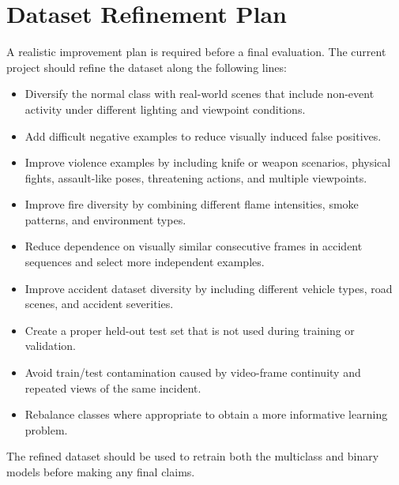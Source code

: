 \documentclass[11pt,a4paper]{article}
\begin{document}
\section{Dataset Refinement Plan}
A realistic improvement plan is required before a final evaluation. The current project should refine the dataset along the following lines:
\begin{itemize}[leftmargin=1.5em]
    \item Diversify the normal class with real-world scenes that include non-event activity under different lighting and viewpoint conditions.
    \item Add difficult negative examples to reduce visually induced false positives.
    \item Improve violence examples by including knife or weapon scenarios, physical fights, assault-like poses, threatening actions, and multiple viewpoints.
    \item Improve fire diversity by combining different flame intensities, smoke patterns, and environment types.
    \item Reduce dependence on visually similar consecutive frames in accident sequences and select more independent examples.
    \item Improve accident dataset diversity by including different vehicle types, road scenes, and accident severities.
    \item Create a proper held-out test set that is not used during training or validation.
    \item Avoid train/test contamination caused by video-frame continuity and repeated views of the same incident.
    \item Rebalance classes where appropriate to obtain a more informative learning problem.
\end{itemize}
The refined dataset should be used to retrain both the multiclass and binary models before making any final claims.
\end{document}
